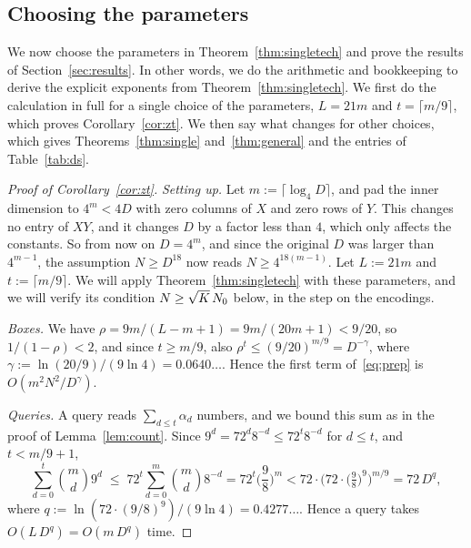 \subsection{Choosing the parameters}\label{sec:corproofs}

We now choose the parameters in Theorem~\ref{thm:singletech} and prove the results of Section~\ref{sec:results}. In other words, we do the arithmetic and bookkeeping to derive the explicit exponents from Theorem~\ref{thm:singletech}. We first do the calculation in full for a single choice of the parameters, $L=21m$ and $t=\lceil m/9\rceil$, which proves Corollary~\ref{cor:zt}. We then say what changes for other choices, which gives Theorems~\ref{thm:single} and~\ref{thm:general} and the entries of Table~\ref{tab:ds}.

\begin{proof}[Proof of Corollary~\ref{cor:zt}]
\emph{Setting up.} Let $m:=\lceil\log_4D\rceil$, and pad the inner dimension to $4^m<4D$ with zero columns of $X$ and zero rows of $Y$. This changes no entry of $XY$, and it changes $D$ by a factor less than $4$, which only affects the constants. So from now on $D=4^m$, and since the original $D$ was larger than $4^{m-1}$, the assumption $N\ge D^{18}$ now reads $N\ge4^{18(m-1)}$. Let $L:=21m$ and $t:=\lceil m/9\rceil$. We will apply Theorem~\ref{thm:singletech} with these parameters, and we will verify its condition $N\ge\sqrt K\,N_0$ below, in the step on the encodings.

\emph{Boxes.} We have $\rho=9m/(L-m+1)=9m/(20m+1)<9/20$, so $1/(1-\rho)<2$, and since $t\ge m/9$, also $\rho^t\le(9/20)^{m/9}=D^{-\gamma}$, where $\gamma:=\ln(20/9)/(9\ln4)=0.0640\ldots$. Hence the first term of~\eqref{eq:prep} is $O(m^2N^2/D^{\gamma})$.

\emph{Queries.} A query reads $\sum_{d\le t}\alpha_d$ numbers, and we bound this sum as in the proof of Lemma~\ref{lem:count}. Since $9^d=72^d8^{-d}\le72^t8^{-d}$ for $d\le t$, and $t<m/9+1$,
\[
\sum_{d=0}^{t}\binom md9^d\;\le\;72^t\sum_{d=0}^{m}\binom md8^{-d}=72^t\Big(\frac98\Big)^m<72\cdot\Big(72\cdot\big(\tfrac98\big)^9\Big)^{m/9}=72\,D^{q},
\]
where $q:=\ln(72\cdot(9/8)^9)/(9\ln4)=0.4277\ldots$. Hence a query takes $O(L\,D^{q})=O(m\,D^{q})$ time.


\end{proof}
